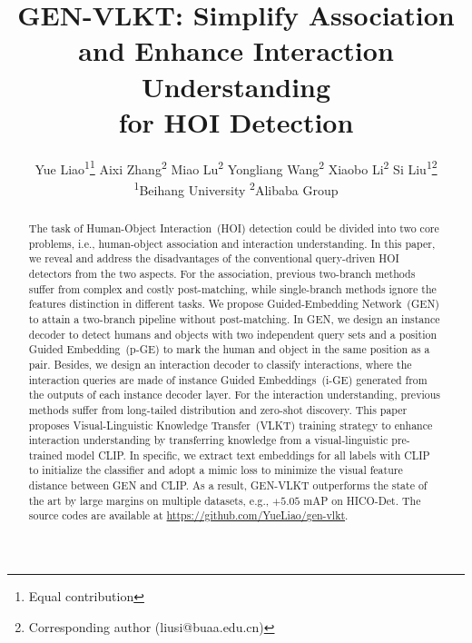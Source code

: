 \documentclass[10pt,twocolumn,letterpaper]{article}
\makeatletter
\newcommand{\printfnsymbol}[1]{\textsuperscript{\@fnsymbol{#1}}}
\makeatother
\begin{document}
\title{GEN-VLKT: Simplify Association and Enhance Interaction Understanding \\ for HOI Detection}

\author{  
  Yue Liao\textsuperscript{\rm 1}\thanks{Equal contribution} \quad Aixi Zhang\textsuperscript{\rm 2}\printfnsymbol{1} \quad Miao Lu\textsuperscript{\rm 2} \quad Yongliang Wang\textsuperscript{\rm 2} \quad Xiaobo Li\textsuperscript{\rm 2}  \quad Si Liu\textsuperscript{\rm 1}\thanks{Corresponding author (liusi@buaa.edu.cn)} \\

   \textsuperscript{\rm 1}Beihang University \quad
  \textsuperscript{\rm 2}Alibaba Group 
}
\maketitle

\begin{abstract}
The task of Human-Object Interaction~(HOI) detection could be divided into two core problems, i.e., human-object association and interaction understanding. In this paper, we reveal and address the disadvantages of the conventional query-driven HOI detectors from the two aspects.
For the association, previous two-branch methods suffer from complex and costly post-matching, while single-branch methods ignore the features distinction in different tasks. We propose Guided-Embedding Network~(GEN) to attain a two-branch pipeline without post-matching. In GEN, we design an instance decoder to detect humans and objects with two independent query sets and a position Guided Embedding~(p-GE) to mark the human and object in the same position as a pair. Besides, we design an interaction decoder to classify interactions, where the interaction queries are made of instance Guided Embeddings~(i-GE) generated from the outputs of each instance decoder layer.
For the interaction understanding, previous methods suffer from long-tailed distribution and zero-shot discovery. This paper proposes Visual-Linguistic Knowledge Transfer~(VLKT) training strategy to enhance interaction understanding by transferring knowledge from a visual-linguistic pre-trained model CLIP.  In specific, we extract text embeddings for all labels with CLIP to initialize the classifier and adopt a mimic loss to minimize the visual feature distance between GEN and CLIP. As a result, GEN-VLKT outperforms the state of the art by large margins on multiple datasets, e.g., $+5.05$ mAP on HICO-Det. The source codes are available at \url{https://github.com/YueLiao/gen-vlkt}.
\end{abstract}
\end{document}
